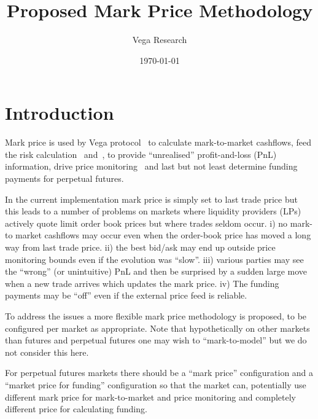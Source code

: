 \documentclass[10pt]{article}
\author{Vega Research}
\title{Proposed Mark Price Methodology}
\date{
    \vspace{2em}
    \today\\
    \vspace{0.5em}
    {\footnotesize }
    \vspace{2em}
}
\begin{document}
\thispagestyle{empty} %
\pagestyle{plain}
\lhead[{}{}]       {{}{}}
\rhead[{}{}]       {{}{}}

\maketitle


\pagestyle{fancyplain}
\rhead{\rightmark}
\cfoot{\thepage}


\section{Introduction}

Mark price is used by Vega protocol~\cite{vega whitepaper} to calculate mark-to-market cashflows, feed the risk calculation~\cite{margins paper} and~\cite{margins spec}, to provide ``unrealised'' profit-and-loss (PnL) information, drive price monitoring~\cite{price monitoring spec} and last but not least determine funding payments for perpetual futures. 

In the current implementation mark price is simply set to last trade price but this leads to a number of problems on markets where liquidity providers (LPs) actively quote limit order book prices but where trades seldom occur. i) no mark-to market cashflows may occur even when the order-book price has moved a long way from last trade price. ii) the best bid/ask may end up outside price monitoring bounds even if the evolution was ``slow''. iii) various parties may see the ``wrong'' (or unintuitive) PnL and then be surprised by a sudden large move when a new trade arrives which updates the mark price. iv) The funding payments may be ``off'' even if the external price feed is reliable. 

To address the issues a more flexible mark price methodology is proposed, to be configured per market as appropriate. 
Note that hypothetically on other markets than futures and perpetual futures one may wish to ``mark-to-model'' but we do not consider this here. 

For perpetual futures markets there should be a ``mark price'' configuration and a ``market price for funding'' configuration so that the market can, potentially use different mark price for mark-to-market and price monitoring and completely different price for calculating funding. 
\end{document}
